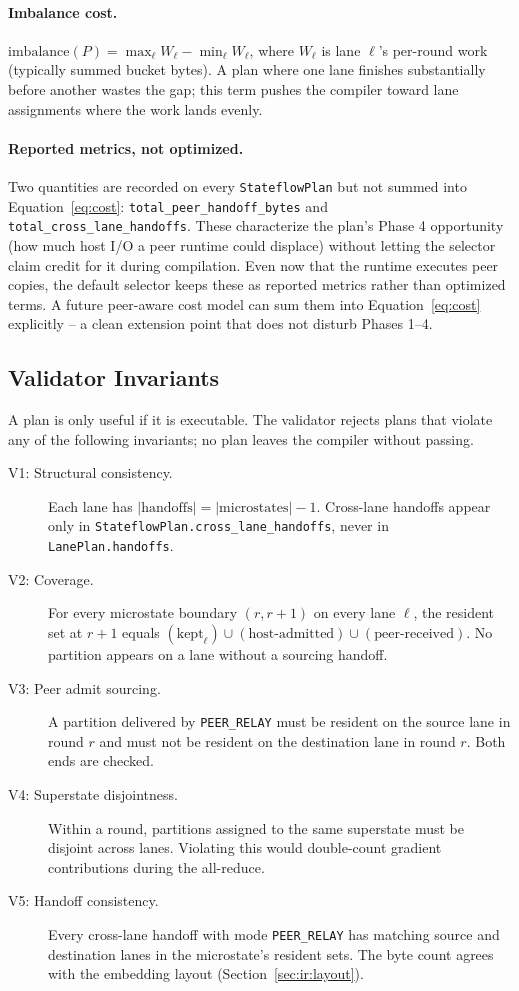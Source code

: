 \paragraph{Imbalance cost.} $\mathrm{imbalance}(P) = \max_\ell W_\ell
- \min_\ell W_\ell$, where $W_\ell$ is lane $\ell$'s per-round work
(typically summed bucket bytes). A plan where one lane finishes
substantially before another wastes the gap; this term pushes the
compiler toward lane assignments where the work lands evenly.

\paragraph{Reported metrics, not optimized.} Two quantities are
recorded on every \texttt{StateflowPlan} but not summed into
Equation~\ref{eq:cost}: \texttt{total\_peer\_handoff\_bytes} and
\texttt{total\_cross\_lane\_handoffs}. These characterize the plan's
Phase 4 opportunity (how much host I/O a peer runtime could displace)
without letting the selector claim credit for it during compilation.
Even now that the runtime executes peer copies, the default selector
keeps these as reported metrics rather than optimized terms. A future
peer-aware cost model can sum them into Equation~\ref{eq:cost}
explicitly -- a clean extension point that does not disturb Phases 1--4.

\subsection{Validator Invariants}\label{sec:ir:validator}

A plan is only useful if it is executable. The validator rejects plans
that violate any of the following invariants; no plan leaves the
compiler without passing.

\begin{description}
\item[V1: Structural consistency.] Each lane has
$|\text{handoffs}| = |\text{microstates}| - 1$. Cross-lane handoffs
appear only in \texttt{StateflowPlan.cross\_lane\_handoffs}, never in
\texttt{LanePlan.handoffs}.
\item[V2: Coverage.] For every microstate boundary $(r, r{+}1)$ on
every lane $\ell$, the resident set at $r{+}1$ equals
$(\text{kept}_{\ell}) \cup (\text{host-admitted}) \cup
 (\text{peer-received})$. No partition appears on a lane without a
sourcing handoff.
\item[V3: Peer admit sourcing.] A partition delivered by
\texttt{PEER\_RELAY} must be resident on the source lane in round $r$
and must not be resident on the destination lane in round $r$. Both
ends are checked.
\item[V4: Superstate disjointness.] Within a round, partitions
assigned to the same superstate must be disjoint across lanes.
Violating this would double-count gradient contributions during the
all-reduce.
\item[V5: Handoff consistency.] Every cross-lane handoff with mode
\texttt{PEER\_RELAY} has matching source and destination lanes in the
microstate's resident sets. The byte count agrees with the embedding
layout (Section~\ref{sec:ir:layout}).
\end{description}

